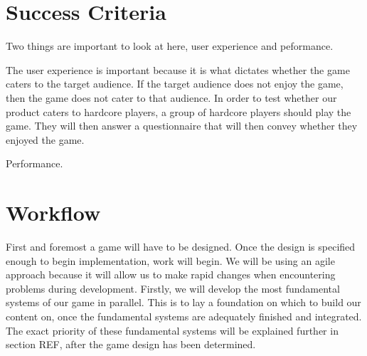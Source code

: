 \section{Success Criteria}
Two things are important to look at here, user experience and peformance.

The user experience is important because it is what dictates whether the game caters to the target audience.
If the target audience does not enjoy the game, then the game does not cater to that audience.
In order to test whether our product caters to hardcore players, a group of hardcore players should play the game.
They will then answer a questionnaire that will then convey whether they enjoyed the game.

Performance.

\section{Workflow}
First and foremost a game will have to be designed.
Once the design is specified enough to begin implementation, work will begin.
We will be using an agile approach because it will allow us to make rapid changes when encountering problems during development.
Firstly, we will develop the most fundamental systems of our game in parallel.
This is to lay a foundation on which to build our content on, once the fundamental systems are adequately finished and integrated.
The exact priority of these fundamental systems will be explained further in section  REF, after the game design has been determined.	